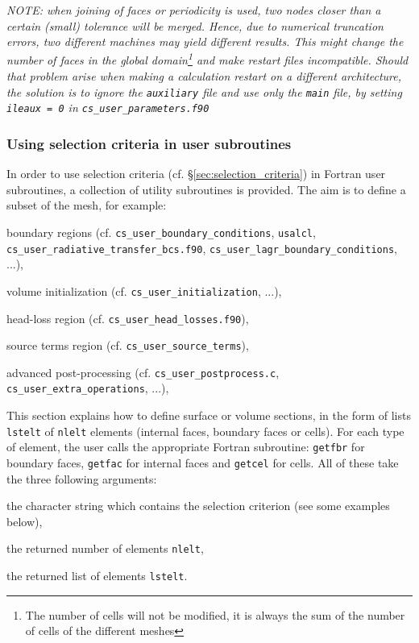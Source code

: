 {{{{{\em NOTE: when joining of faces or periodicity is used, two nodes closer
than a certain (small) tolerance will be merged. Hence, due to numerical
truncation errors, two different machines may yield different results.
This might change the number of faces in the global
domain\footnote{The number of cells will not be modified, it is always the sum of the
number of cells of the different meshes} and make restart files
incompatible. Should that problem arise when making a calculation restart on a
different architecture, the solution is to ignore the \texttt{auxiliary}
file and use only the \texttt{main} file, by setting \texttt{ileaux = 0}
in \texttt{cs\_user\_parameters.f90}}

\subsubsection{Using selection criteria in user subroutines}
\label{sec:fvm_selector}

In order to use selection criteria (cf. \S\ref{sec:selection_criteria}) in Fortran
user subroutines, a collection of utility subroutines is provided. The aim is to
define a subset of the mesh, for example:

\begin{list}{-}{}
\item boundary regions (cf. \texttt{cs\_user\_boundary\_conditions}, \texttt{usalcl},
\texttt{cs\_user\_radiative\_transfer\_bcs.f90}, \texttt{cs\_user\_lagr\_boundary\_conditions}, ...),
\item volume initialization (cf. \texttt{cs\_user\_initialization}, ...),
\item head-loss region (cf. \texttt{cs\_user\_head\_losses.f90}),
\item source terms region (cf. \texttt{cs\_user\_source\_terms}),
\item advanced post-processing (cf. \texttt{cs\_user\_postprocess.c},
      \texttt{cs\_user\_extra\_operations}, ...),
\end{list}

This section explains how to define surface or volume sections,
in the form of lists \texttt{lstelt} of \texttt{nlelt} elements
(internal faces, boundary faces or cells).
For each type of element, the user calls the appropriate Fortran
subroutine: \texttt{getfbr}
for boundary faces, \texttt{getfac} for internal faces
and \texttt{getcel} for cells. All of these take
the three following arguments:
\begin{list}{-}{}
\item the character string which contains the selection
      criterion (see some examples below),
\item the returned number of elements \texttt{nlelt},
\item the returned list of elements \texttt{lstelt}.
\end{list}

}}}}

